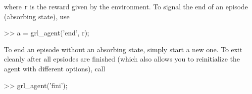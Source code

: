 \documentclass{article}
\newcommand{\txt}[1]{\texttt{#1}}
\newenvironment{code}{\alltt}{\endalltt}
\begin{document}
where \txt{r} is the reward given by the environment. To signal the end of
an episode (absorbing state), use

\begin{code}
>> a = grl_agent('end', r);
\end{code}

To end an episode without an absorbing state, simply start a new one. To
exit cleanly after all epsiodes are finished (which also allows you to
reinitialize the agent with different options), call

\begin{code}
>> grl_agent('fini');
\end{code}
\end{document}
